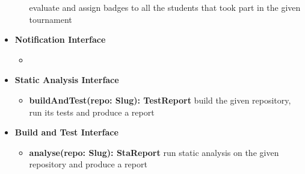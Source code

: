 \begin{itemize}
\begin{itemize}
                    evaluate and assign badges to all the students that took part in the given tournament
          \end{itemize}
    \item \textbf{Notification Interface}
          \begin{itemize}
              \item
          \end{itemize}
    \item \textbf{Static Analysis Interface}
          \begin{itemize}
              \item \textbf{buildAndTest(repo: Slug): TestReport}
                    build the given repository, run its tests and produce a report
          \end{itemize}
    \item \textbf{Build and Test Interface}
          \begin{itemize}
              \item \textbf{analyse(repo: Slug): StaReport}
                    run static analysis on the given repository and produce a report
          \end{itemize}
\end{itemize}

